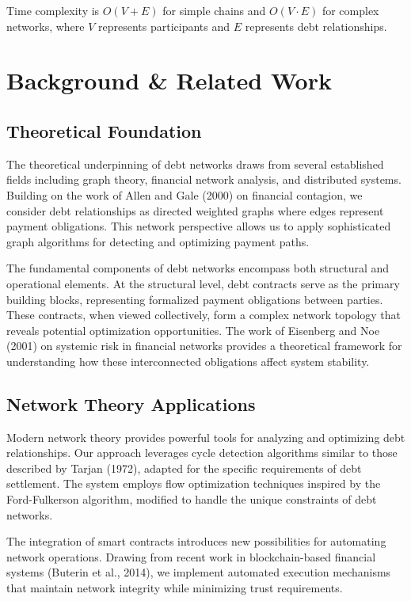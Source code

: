 \documentclass[twocolumn,10pt,a4paper]{article}
\begin{document}
Time complexity is $O(V + E)$ for simple chains and $O(V \cdot E)$ for complex networks, where $V$ represents participants and $E$ represents debt relationships.

\twocolumn  %

\section{Background \& Related Work}
\subsection{Theoretical Foundation}
The theoretical underpinning of debt networks draws from several established fields including graph theory, financial network analysis, and distributed systems. Building on the work of Allen and Gale (2000)\cite{allen2000financial} on financial contagion, we consider debt relationships as directed weighted graphs where edges represent payment obligations. This network perspective allows us to apply sophisticated graph algorithms for detecting and optimizing payment paths.

The fundamental components of debt networks encompass both structural and operational elements. At the structural level, debt contracts serve as the primary building blocks, representing formalized payment obligations between parties. These contracts, when viewed collectively, form a complex network topology that reveals potential optimization opportunities. The work of Eisenberg and Noe (2001)\cite{eisenberg2001systemic} on systemic risk in financial networks provides a theoretical framework for understanding how these interconnected obligations affect system stability.

\subsection{Network Theory Applications}
Modern network theory provides powerful tools for analyzing and optimizing debt relationships. Our approach leverages cycle detection algorithms similar to those described by Tarjan (1972)\cite{tarjan1972depth}, adapted for the specific requirements of debt settlement. The system employs flow optimization techniques inspired by the Ford-Fulkerson algorithm\cite{ford1956maximal}, modified to handle the unique constraints of debt networks.

The integration of smart contracts introduces new possibilities for automating network operations. Drawing from recent work in blockchain-based financial systems (Buterin et al., 2014)\cite{buterin2014next}, we implement automated execution mechanisms that maintain network integrity while minimizing trust requirements.
\end{document}
